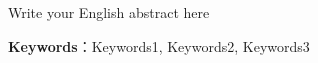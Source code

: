 \newpage
{}
\pagestyle{fancy}
\lhead{}
\vspace*{0.3cm}
\begin{center}

    { \par}

\end{center}

\begin{spacing}{1.0}
	Write your English abstract here

\vspace{2em}
\par \noindent\textbf{Keywords}：Keywords1, Keywords2, Keywords3
\end{spacing} 